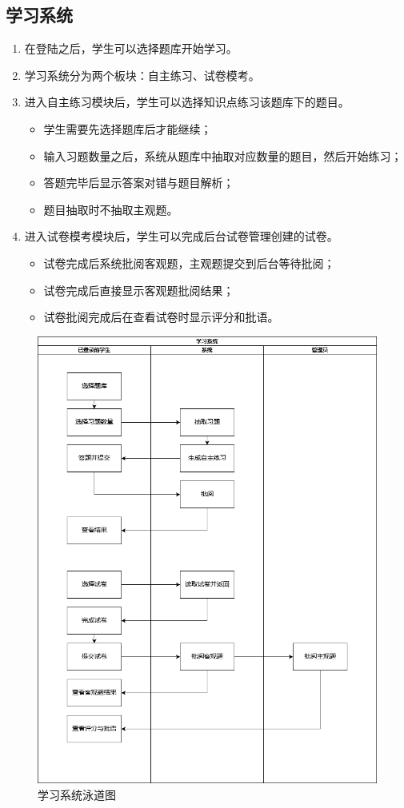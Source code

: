 \documentclass{article}
\begin{document}
    \subsection{学习系统}
    	\begin{enumerate}
    		\item 在登陆之后，学生可以选择题库开始学习。
    		\item 学习系统分为两个板块：自主练习、试卷模考。
    		\item 进入自主练习模块后，学生可以选择知识点练习该题库下的题目。
    		\begin{itemize}
    			\item 学生需要先选择题库后才能继续；
    			\item 输入习题数量之后，系统从题库中抽取对应数量的题目，然后开始练习；
    			\item 答题完毕后显示答案对错与题目解析；
    			\item 题目抽取时不抽取主观题。
    		\end{itemize}
   			\item 进入试卷模考模块后，学生可以完成后台试卷管理创建的试卷。
   			\begin{itemize}
   				\item 试卷完成后系统批阅客观题，主观题提交到后台等待批阅；
   				\item 试卷完成后直接显示客观题批阅结果；
   				\item 试卷批阅完成后在查看试卷时显示评分和批语。
   			\end{itemize}
    	\end{enumerate}
	    \begin{figure}[H]
		    \centering
		    \includegraphics[width=.8\textwidth]{./LearningSystem.png}
		    \caption{学习系统泳道图}
		\end{figure}
\end{document}
